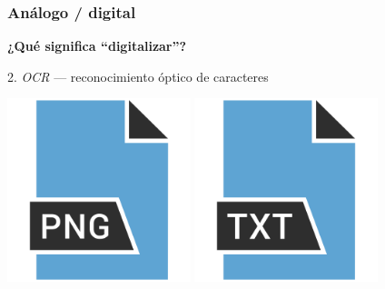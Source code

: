 \documentclass[%
  handout, %
  xcolor=svgnames]{beamer}
\newcommand{\Rojo}{\color[HTML]{8B0000}}
\newcommand*{\rojo}[1]{\textcolor[HTML]{8B0000}{#1}}
\newcommand*{\rojoit}[1]{\textit{\textcolor[HTML]{8B0000}{#1}}}
\newcommand{\Azul}{\color[HTML]{14145A}}
\begin{document}
\begin{frame}
  \frametitle{Análogo / digital}
  
  {\large\Azul\textbf{¿Qué significa \enquote{digitalizar}?}}

  \bigskip

  \rojo{2.} \rojoit{OCR} --- reconocimiento óptico de caracteres

  \begin{center}
    \includegraphics[width=0.4\textwidth]{img/image.png} %
    \quad%
    \raisebox{2cm}{{\Rojo\Huge$\Rightarrow$}}
    \quad%
    \includegraphics[width=0.4\textwidth]{img/text.png} %
    
  \end{center}

\end{frame}
\end{document}
